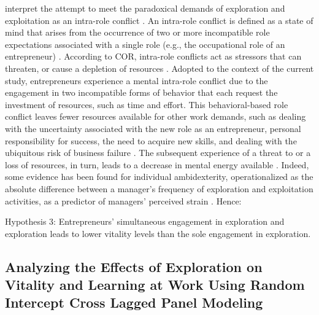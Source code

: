 \documentclass[man, 12pt, a4paper, noextraspace]{apa6}
\begin{document}
\textcite{Hunter2017} interpret the attempt to meet the paradoxical demands of exploration and exploitation as an intra-role conflict \parencite{Hunter2017}. 
An intra-role conflict is defined as a state of mind that arises from the occurrence of two or more incompatible role expectations associated with a single role (e.g., the occupational role of an entrepreneur) \parencite{Grandey1999}. 
According to COR, intra-role conflicts act as stressors that can threaten, or cause a depletion of resources \parencite{Hobfoll.1989}.
Adopted to the context of the current study, entrepreneurs experience a mental intra-role conflict due to the engagement in two incompatible forms of behavior that each request the investment of resources, such as time and effort. 
This behavioral-based role conflict leaves fewer resources available for other work demands, such as dealing with the uncertainty associated with the new role as an entrepreneur, personal responsibility for success, the need to acquire new skills, and dealing with the ubiquitous risk of business failure \parencite{Byrne.2015, Wincent2009a}.
The subsequent experience of a threat to or a loss of resources, in turn, leads to a decrease in mental energy available \parencite{Hobfoll.1989, Hunter2017}.
Indeed, some evidence has been found for individual ambidexterity, operationalized as the absolute difference between a manager's frequency of exploration and exploitation activities, as a predictor of managers' perceived strain \parencite{Keller2015}.
Hence: \par
Hypothesis 3: Entrepreneurs' simultaneous engagement in exploration and exploration leads to lower vitality levels than the sole engagement in exploration. \par 

\subsection{Analyzing the Effects of Exploration on Vitality and Learning at Work Using Random Intercept Cross Lagged Panel Modeling}
\end{document}
